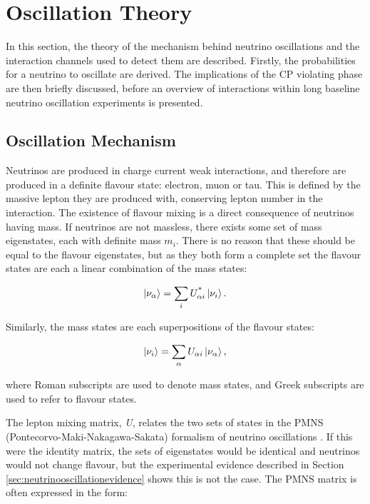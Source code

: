 \section{Oscillation Theory}\label{sec:oscillationtheory}

In this section, the theory of the mechanism behind neutrino oscillations and the interaction channels used to detect them are described. Firstly, the probabilities for a neutrino to oscillate are derived. The implications of the CP violating phase are then briefly discussed, before an overview of interactions within long baseline neutrino oscillation experiments is presented.

\subsection{Oscillation Mechanism}

Neutrinos are produced in charge current weak interactions, and therefore are produced in a definite flavour state: electron, muon or tau. This is defined by the massive lepton they are produced with, conserving lepton number in the interaction. The existence of flavour mixing is a direct consequence of neutrinos having mass. If neutrinos are not massless, there exists some set of mass eigenstates, each with definite mass $m_i$. There is no reason that these should be equal to the flavour eigenstates, but as they both form a complete set the flavour states are each a linear combination of the mass states:

\begin{equation}
\ket{\nu_{\alpha}} = \sum_{i} U^{\text{*}}_{\alpha i} \ket{\nu_{i}}.
\end{equation}

Similarly, the mass states are each superpositions of the flavour states: 

\begin{equation}
\ket{\nu_{i}} = \sum_{\alpha} U_{\alpha i} \ket{\nu_{\alpha}},
\label{eqn:lincomb}
\end{equation}

where Roman subscripts are used to denote mass states, and Greek subscripts are used to refer to flavour states.

The lepton mixing matrix, \textit{U}, relates the two sets of states in the PMNS (Pontecorvo-Maki-Nakagawa-Sakata) formalism of neutrino oscillations \cite{pmns}. If this were the identity matrix, the sets of eigenstates would be identical and neutrinos would not change flavour, but the experimental evidence described in Section \ref{sec:neutrinooscillationevidence} shows this is not the case. The PMNS matrix is often expressed in the form:

